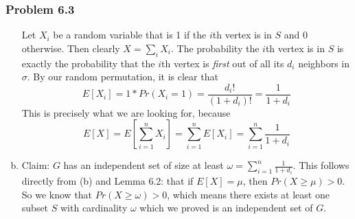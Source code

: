 \documentclass[12pt,letterpaper]{article}
\newenvironment{answer}[1]{
  \subsubsection*{Problem #1}
}{\newpage}
\begin{document}
\begin{answer}{6.3}
\begin{enumerate}[(a)]
		Let $X_i$ be a random variable that is 1 if the $i$th vertex is in $S$ and 0 otherwise. Then clearly $X = \sum_{i} X_i$. The probability the $i$th vertex is in $S$ is exactly the probability that the $i$th vertex is \emph{first} out of all its $d_i$ neighbors in $\sigma$. By our random permutation, it is clear that
		$$E[X_i] = 1 * Pr(X_i = 1) = \frac{d_i!}{(1 + d_i)!} = \frac{1}{1 + d_i}$$
		This is precisely what we are looking for, because
		$$E[X] = E[\sum_{i=1}^n X_i] = \sum_{i=1}^n E[X_i] = \sum_{i=1}^n \frac{1}{1 + d_i}$$

	\item Claim: $G$ has an independent set of size at least $\omega = \sum_{i=1}^n \frac{1}{1 + d_i}$. This follows directly from (b) and Lemma 6.2: that if $E[X] = \mu$, then $Pr(X \ge \mu) > 0$. So we know that $Pr(X \ge \omega) > 0$, which means there exists at least one subset $S$ with cardinality $\omega$ which we proved is an independent set of $G$.

\end{enumerate}
\end{answer}
\end{document}
